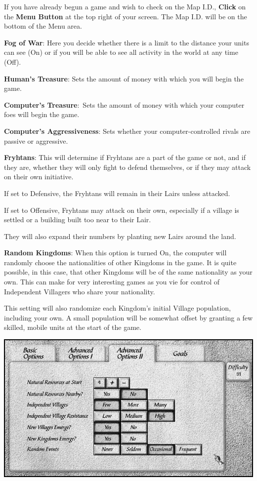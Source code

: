 \begin{changemargin}{0.5cm}{0cm} 
 If you have already begun a game and wish to check on the Map I.D., \textbf{Click} on the \textbf{Menu Button} at the top right of your screen. The Map I.D. will be on the bottom of the Menu area.
\end{changemargin}

\textbf{Fog of War}: Here you decide whether there is a limit to the distance your units can see (On) or if you will be able to see all activity in the world at any time (Off).

\textbf{Human’s Treasure}: Sets the amount of money with which you will begin the game.

\textbf{Computer’s Treasure}: Sets the amount of money with which your computer foes will begin the game.

\textbf{Computer’s Aggressiveness}: Sets whether your computer-controlled rivals are passive or aggressive.

\textbf{Fryhtans}: This will determine if Fryhtans are a part of the game or not, and if they are, whether they will only fight to defend themselves, or if they may attack on their own initiative.

\begin{changemargin}{.5cm}{0cm}
If set to Defensive, the Fryhtans will remain in their Lairs unless attacked.

If set to Offensive, Fryhtans may attack on their own, especially if a village is settled or a building built too near to their Lair. 

They will also expand their numbers by planting new Lairs around the land.
\end{changemargin}

\textbf{Random Kingdoms}: When this option is turned On, the computer will randomly choose the nationalities of other Kingdoms in the game. It is quite possible, in this case, that other Kingdoms will be of the same nationality as your own. This can make for very interesting games as you vie for control of Independent Villagers who share your nationality.

This setting will also randomize each Kingdom’s initial Village population, including your own. A small population will be somewhat offset by granting a few skilled, mobile units at the start of the game.

\begin{center}
	\includegraphics[width=0.9\linewidth]{Iadvancedoptions2}
\end{center}

